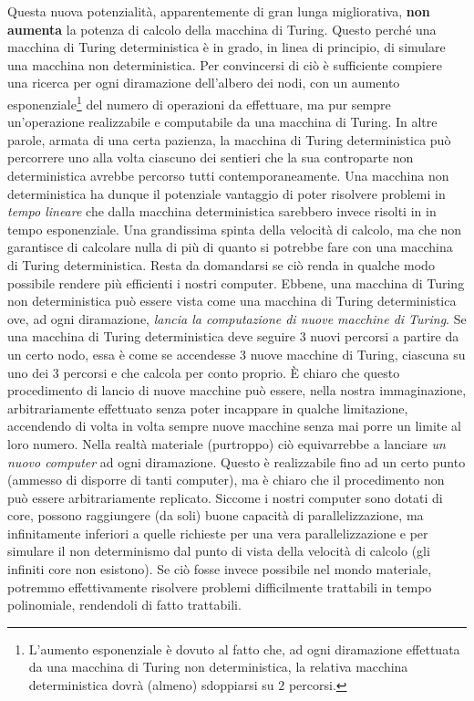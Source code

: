 \documentclass[10pt]{\classname}
\begin{document}
Questa nuova potenzialità, apparentemente di
gran lunga migliorativa, \textbf{non aumenta} la potenza di calcolo della
macchina di Turing. Questo perché una macchina di Turing deterministica è in grado, in linea di principio, di
simulare una macchina non deterministica. Per convincersi di ciò è sufficiente
compiere una ricerca per ogni diramazione dell'albero dei nodi, con un aumento
esponenziale\footnote{L'aumento esponenziale è dovuto al fatto che, ad ogni
diramazione effettuata da una macchina di Turing non deterministica, la
relativa macchina deterministica dovrà (almeno) sdoppiarsi su $2$ percorsi.}
del numero di operazioni da effettuare, ma pur sempre un'operazione
realizzabile e computabile da una macchina di Turing. In altre parole, armata
di una certa pazienza, la macchina di Turing deterministica può percorrere uno
alla volta ciascuno dei sentieri che la sua controparte non deterministica
avrebbe percorso tutti contemporaneamente. Una macchina non deterministica ha
dunque il potenziale vantaggio di poter risolvere problemi in \emph{tempo
lineare} che dalla macchina deterministica sarebbero invece risolti in in tempo
esponenziale. Una grandissima spinta della velocità di calcolo, ma che non
garantisce di calcolare nulla di più di quanto si potrebbe fare con una
macchina di Turing deterministica. Resta da domandarsi se ciò renda in qualche
modo possibile rendere più efficienti i nostri computer. Ebbene, una macchina
di Turing non deterministica può essere vista come una macchina di Turing
deterministica ove, ad ogni diramazione, \emph{lancia la computazione di nuove
macchine di Turing}. Se una macchina di Turing deterministica deve seguire 3
nuovi percorsi a partire da un certo nodo, essa è come se accendesse 3 nuove
macchine di Turing, ciascuna su uno dei 3 percorsi e che calcola per conto
proprio. È chiaro che questo procedimento di lancio di nuove macchine può
essere, nella nostra immaginazione, arbitrariamente effettuato senza poter
incappare in qualche limitazione, accendendo di volta in volta sempre nuove macchine senza mai porre un limite al loro numero. Nella realtà materiale (purtroppo) ciò
equivarrebbe a lanciare \emph{un nuovo computer} ad ogni diramazione. Questo è
realizzabile fino ad un certo punto (ammesso di disporre di tanti computer), ma
è chiaro che il procedimento non può essere arbitrariamente replicato. Siccome
i nostri computer sono dotati di core, possono raggiungere (da soli) buone
capacità di parallelizzazione, ma infinitamente inferiori a quelle richieste
per una vera parallelizzazione e per simulare il non determinismo dal punto di
vista della velocità di calcolo (gli infiniti core non esistono). Se ciò fosse
invece possibile nel mondo materiale, potremmo effettivamente risolvere
problemi difficilmente trattabili in tempo polinomiale, rendendoli di fatto
trattabili.
\end{document}
